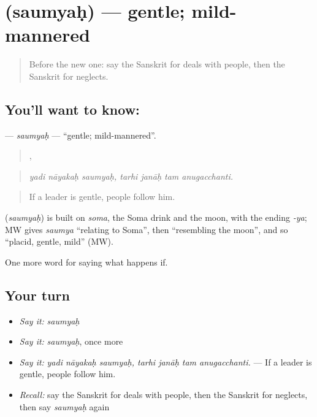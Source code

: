 \section[\texorpdfstring{\sk{सौम्यः} (saumyaḥ)}{सौम्यः (saumyaḥ)}]{ (saumyaḥ) — gentle; mild-mannered}

\label{lesson:SA-C388-saumyah}



\begin{quote}
Before the new one: say the Sanskrit for deals with people, then the Sanskrit for neglects.
\end{quote}

\subsection*{You'll want to know: }
\textbf{} — \emph{saumyaḥ} — \textquotedblleft{}gentle; mild-mannered\textquotedblright{}.

\begin{quote}
  ,    
\end{quote}

\begin{quote}
\emph{yadi nāyakaḥ saumyaḥ, tarhi janāḥ tam anugacchanti.}
\end{quote}

\begin{quote}
If a leader is gentle, people follow him.
\end{quote}

\begin{cousinweb}
\textbf{} (\emph{saumyaḥ}) is built on \emph{soma}, the Soma drink and the moon, with the ending \emph{-ya}; MW gives \emph{saumya} \textquotedblleft{}relating to Soma\textquotedblright{}, then \textquotedblleft{}resembling the moon\textquotedblright{}, and so \textquotedblleft{}placid, gentle, mild\textquotedblright{} (MW).
\end{cousinweb}

\begin{grammarlens}[title={What you've built}]
One more word for saying what happens if.
\end{grammarlens}

\subsection*{Your turn}
\begin{itemize}
\raggedright
  \item \emph{Say it:} \emph{saumyaḥ}
  \item \emph{Say it:} \emph{saumyaḥ}, once more
  \item \emph{Say it:} \emph{yadi nāyakaḥ saumyaḥ, tarhi janāḥ tam anugacchanti.} — If a leader is gentle, people follow him.
  \item \emph{Recall:} say the Sanskrit for deals with people, then the Sanskrit for neglects, then say \emph{saumyaḥ} again
\end{itemize}

